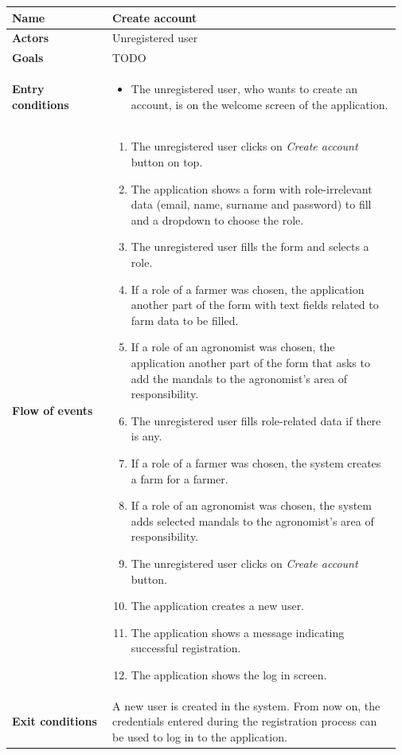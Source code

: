 \begin{table}[H]
	\begin{tabular}{@{}p{0.25\linewidth} p{0.72\linewidth}@{}}
		\toprule
		\textbf{Name}               & Create account \\
		\midrule
		\textbf{Actors}             & Unregistered user \\
		\midrule
		\textbf{Goals}              & TODO \\
		\midrule
		
		\textbf{Entry conditions}   & \begin{itemize}[leftmargin=.4cm,noitemsep,topsep=0pt,before=\vspace{-3mm},after=\vspace{-4mm}]
		    \item The unregistered user, who wants to create an account, is  on the welcome screen of the application.
		\end{itemize}\\
		\midrule
		
		\textbf{Flow of events}     & \begin{enumerate}[leftmargin=.4cm,noitemsep,topsep=0pt,before=\vspace{-3mm},after=\vspace{-4mm}]
		    \item The unregistered user clicks on \textit{Create account} button on top.
		    \item The application shows a form with role-irrelevant data (email, name, surname and password) to fill and a dropdown to choose the role.
		    \item The unregistered user fills the form and selects a role.
		    \item If a role of a farmer was chosen, the application another part of the form with text fields related to farm data to be filled.
		    \item If a role of an agronomist was chosen, the application another part of the form that asks to add the mandals to the agronomist's area of responsibility.
		    \item The unregistered user fills role-related data if there is any.
		    \item If a role of a farmer was chosen, the system creates a farm for a farmer.
		    \item If a role of an agronomist was chosen, the system adds selected mandals to the agronomist's area of responsibility.
		    \item The unregistered user clicks on \textit{Create account} button.
		    \item The application creates a new user.
		    \item The application shows a message indicating successful registration.
		    \item The application shows the log in screen.
		\end{enumerate}\\
		\midrule
		\textbf{Exit conditions}    & A new user is created in the system. From now on, the credentials entered during the registration process can be used to log in to the application. \\
		\midrule
		

\end{tabular}
\end{table}
